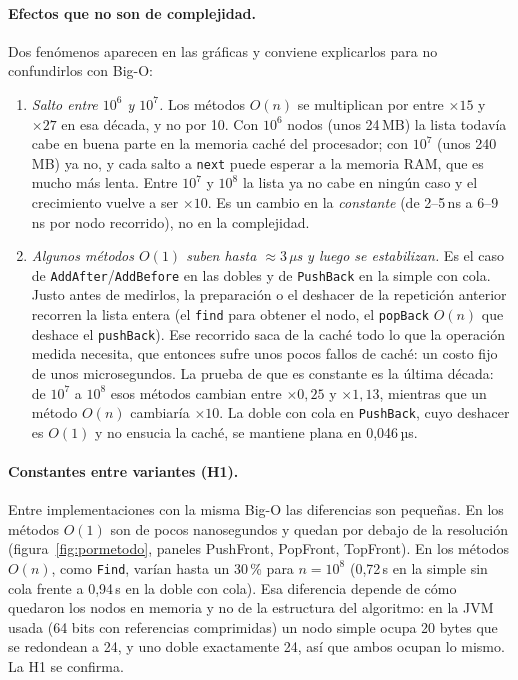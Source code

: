 \documentclass[11pt,a4paper]{article}
\newcommand{\us}{\,µs}
\newcommand{\Oone}{$O(1)$}
\newcommand{\On}{$O(n)$}
\begin{document}
\paragraph{Efectos que no son de complejidad.} Dos fenómenos aparecen en las gráficas y conviene
explicarlos para no confundirlos con Big-O:
\begin{enumerate}
\item \emph{Salto entre $10^6$ y $10^7$.} Los métodos \On{} se multiplican por entre $\times15$ y $\times27$ en esa
  década, y no por 10. Con $10^6$ nodos (unos 24\,MB) la lista todavía cabe en buena parte en la memoria
  caché del procesador; con $10^7$ (unos 240\,MB) ya no, y cada salto a \texttt{next} puede esperar a
  la memoria RAM, que es mucho más lenta. Entre $10^7$ y $10^8$ la lista ya no cabe en ningún caso y el
  crecimiento vuelve a ser $\times10$. Es un cambio en la \emph{constante} (de 2--5\,ns a
  6--9\,ns por nodo recorrido), no en la complejidad.
\item \emph{Algunos métodos \Oone{} suben hasta $\approx3$\us{} y luego se estabilizan.} Es el caso de
  \texttt{AddAfter}/\texttt{AddBefore} en las dobles y de \texttt{PushBack} en la simple con cola.
  Justo antes de medirlos, la preparación o el deshacer de la repetición anterior recorren la lista
  entera (el \texttt{find} para obtener el nodo, el \texttt{popBack} \On{} que deshace el
  \texttt{pushBack}). Ese recorrido saca de la caché todo lo que la operación medida necesita, que
  entonces sufre unos pocos fallos de caché: un costo fijo de unos microsegundos. La prueba de que es
  constante es la última década: de $10^7$ a $10^8$ esos métodos cambian entre $\times0{,}25$ y $\times1{,}13$,
  mientras que un método \On{} cambiaría $\times10$. La doble con cola en \texttt{PushBack}, cuyo
  deshacer es \Oone{} y no ensucia la caché, se mantiene plana en 0,046\us.
\end{enumerate}

\paragraph{Constantes entre variantes (H1).} Entre implementaciones con la misma Big-O las
diferencias son pequeñas. En los métodos \Oone{} son de pocos nanosegundos y quedan por debajo de la
resolución (figura~\ref{fig:pormetodo}, paneles PushFront, PopFront, TopFront). En los métodos \On{},
como \texttt{Find}, varían hasta un 30\,\% para $n=10^8$ (0,72\,s en la simple sin cola frente a
0,94\,s en la doble con cola). Esa diferencia depende de cómo quedaron los nodos en memoria y no de la
estructura del algoritmo: en la JVM usada (64 bits con referencias comprimidas) un nodo simple ocupa
20 bytes que se redondean a 24, y uno doble exactamente 24, así que ambos ocupan lo mismo. La H1 se
confirma.
\end{document}

